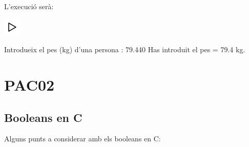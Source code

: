 \documentclass[]{book}
\newenvironment{Shaded}{\begin{snugshade}}{\end{snugshade}}
\newcommand{\FloatTok}[1]{\textcolor[rgb]{0.00,0.00,0.81}{#1}}
\newcommand{\NormalTok}[1]{#1}
\begin{document}
L'execució serà:

\includegraphics{./img/play.png}

\begin{Shaded}
\begin{Highlighting}[]
\NormalTok{Introdueix el pes (kg) d’una persona : }\FloatTok{79.440}
\NormalTok{Has introduit el pes = }\FloatTok{79.4}\NormalTok{ kg.}
\end{Highlighting}
\end{Shaded}

\chapter{PAC02}\label{pac02}

\section{Booleans en C}\label{booleans}

Alguns punts a considerar amb els booleans en C:
\end{document}
